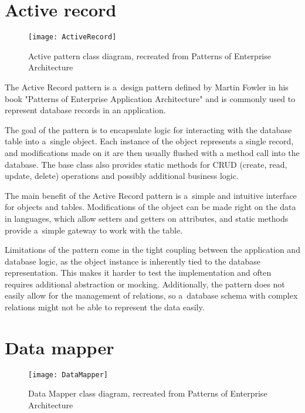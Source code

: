 \section*{Active record}

\begin{figure}[b]
    \caption{Active pattern class diagram, recreated from Patterns of Enterprise Architecture}
    \centering
    \texttt{[image: ActiveRecord]}
\end{figure}

The Active Record pattern is a~design pattern defined by Martin Fowler in his
book "Patterns of Enterprise Application Architecture"
\cite[p. 160]{fowler-patterns-2003} and is commonly used to represent database
records in an application.

The goal of the pattern is to encapsulate logic for interacting with the
database table into a~single object. Each instance of the object represents a
single record, and modifications made on it are then usually flushed with a
method call into the database. The base class also provides static methods for
CRUD (create, read, update, delete) operations and possibly additional business
logic.  

The main benefit of the Active Record pattern is a~simple and intuitive
interface for objects and tables. Modifications of the object can be made right
on the data in languages, which allow setters and getters on attributes, and
static methods provide a~simple gateway to work with the table. 

Limitations of the pattern come in the tight coupling between the application
and database logic, as the object instance is inherently tied to the database
representation. This makes it harder to test the implementation and often
requires additional abstraction or mocking. Additionally, the pattern does not
easily allow for the management of relations, so a~database schema with complex
relations might not be able to represent the data easily. 

\section*{Data mapper}

\begin{figure}[b]
    \caption{Data Mapper class diagram, recreated from Patterns of Enterprise Architecture}
    \centering
    \texttt{[image: DataMapper]}
\end{figure}

